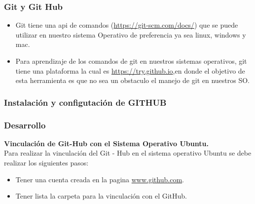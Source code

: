\documentclass[8pt]{beamer}
\begin{document}
\begin{frame}
\frametitle{Git y Git Hub}
\begin{itemize}
\justifying
\item{Git tiene una api de comandos (\url{https://git-scm.com/docs/}) que se puede utilizar en nuestro sistema Operativo de preferencia ya sea linux, windows y mac.}
\justifying
\item{Para aprendizaje de los comandos de git en nuestros  sistemas operativos, git tiene una plataforma la cual es \url{https://try.github.io},en donde el objetivo de esta herramienta es que no sea un obstaculo el manejo de git en nuestros SO.}


\end{itemize}
\end{frame}





\subsubsection{Instalación y configutación de GITHUB}



\begin{frame}
\frametitle{Desarrollo}

\setlength{\parskip}{10pt}
\textbf{Vinculación de Git-Hub con el Sistema Operativo Ubuntu.}\\

\setlength{\parskip}{15pt}
Para realizar la vinculación del Git - Hub en el sistema operativo Ubuntu se debe realizar los siguientes pasos:
\begin{center}

\setlength{\parskip}{5pt}
\begin{itemize}
\item{Tener una cuenta creada en la pagina \url{www.github.com}.}
\item{Tener lista la carpeta  para la  vinculación con el GitHub. }
\end{itemize} 

\setlength{\parskip}{08pt}
\end{center}
\end{frame}
\end{document}
